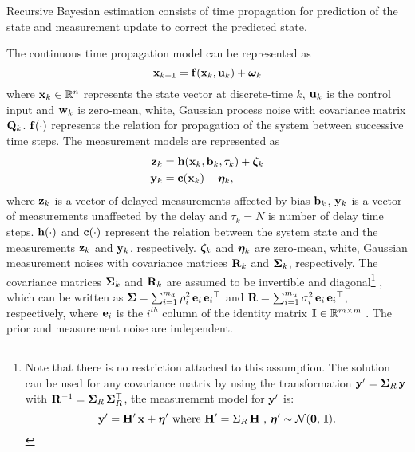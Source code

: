 

Recursive Bayesian estimation consists of time propagation for prediction of the state and measurement update to correct the predicted state.

The continuous time propagation model can be represented as
\begin{equation}
	\label{eqn:StatePropModel}
	\mathbf{x}_{k+1} = \mathbf{f} (\mathbf{x}_k, \mathbf{u}_k ) + \boldsymbol{\omega}_k
\end{equation}
where $\mathbf{x}_k \in\mathbb{R}^n$ represents the state vector at discrete-time $k$, $\mathbf{u}_k$ is the control input and $\mathbf{w}_k$ is zero-mean, white, Gaussian process noise with covariance matrix $\mathbf{Q}_k$. $\mathbf{f} (\cdot)$ represents the relation for propagation of the system between successive time steps.
The measurement models are represented as
\begin{align} 
	\label{eqn:DelayedMeasurementModel}
	\mathbf{z}_k &= \mathbf{h} ( \mathbf{x}_{k}, \mathbf{b}_{k}, \tau_k ) + \boldsymbol{\zeta}_k \\
	\label{eqn:UndelayedMeasurementModel}
	\mathbf{y}_k &= \mathbf{c} ( \mathbf{x}_k ) + \boldsymbol{\eta}_k,
\end{align}
where $\mathbf{z}_k$ is a vector of delayed measurements affected by bias $\mathbf{b}_k$, $\mathbf{y}_k$ is a vector of measurements unaffected by the delay and $\tau_k = N$ is number of delay time steps.
$\mathbf{h}(\cdot)$ and $\mathbf{c}(\cdot)$ represent the relation between the system state and the measurements $\mathbf{z}_k$ and $\mathbf{y}_k$, respectively.
$\boldsymbol{\zeta}_k$ and $\boldsymbol{\eta}_k$ are zero-mean, white, Gaussian measurement noises with covariance matrices $\mathbf{R}_k$ and $\boldsymbol{\Sigma}_k$, respectively.
The covariance matrices $\boldsymbol{\Sigma}_k$ and $\mathbf{R}_k$ are assumed to be invertible and diagonal\footnote
{\label{ftnt:R_assumption}
	Note that there is no restriction attached to this assumption. The solution can be used for any  covariance matrix by using the transformation $\mathbf{y}' =\boldsymbol{\Sigma}_R  \, \mathbf{y}$ with $\mathbf{R}^{-1} = \boldsymbol{\Sigma}_R \, \boldsymbol{\Sigma}_R^\top$, the measurement model for $\mathbf{y}'$ is:
	$$\mathbf{y}'=\mathbf{H}' \,\mathbf{x}+\boldsymbol{\eta}' \mbox{ where } \mathbf{H}' = \Sigma_R  \, \mathbf{H} \mbox{ , } \boldsymbol{\eta}' \sim \mathcal{N}(\boldsymbol{0},\,\mathbf{I}).$$
}
, which can be written as $\boldsymbol{\Sigma} = \sum_{i=1}^{m_d} \rho_{i}^2 \, \mathbf{e}_i  \,{\mathbf{e}_i}^\top$ and $\mathbf{R} = \sum_{i=1}^{m_u} \sigma_{i}^2 \, \mathbf{e}_i  \,{\mathbf{e}_i}^\top$, respectively, where $\mathbf{e}_i$ is the $i^{th}$ column of the identity matrix $\mathbf{I} \in \mathbb{R}^{m \times m}$ .
The prior and measurement noise are independent.

